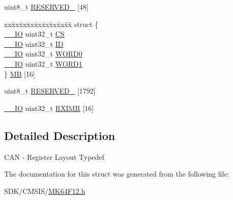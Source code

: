 \begin{DoxyCompactItemize}
\item 
uint8\+\_\+t \mbox{\hyperlink{group___v_r_e_f___peripheral___access___layer_ga3109898e317e51e909c069ce9e83d7be}{R\+E\+S\+E\+R\+V\+E\+D\+\_}} \mbox{[}48\mbox{]}
\item 
\begin{tabbing}
xx\=xx\=xx\=xx\=xx\=xx\=xx\=xx\=xx\=\kill
struct \{\\
\>\mbox{\hyperlink{core__cm4_8h_aec43007d9998a0a0e01faede4133d6be}{\_\_IO}} uint32\_t \mbox{\hyperlink{group___v_r_e_f___peripheral___access___layer_ga5824868cf314b1873a3c1b60bc0a1882}{CS}}\\
\>\mbox{\hyperlink{core__cm4_8h_aec43007d9998a0a0e01faede4133d6be}{\_\_IO}} uint32\_t \mbox{\hyperlink{group___v_r_e_f___peripheral___access___layer_ga88105bb6b46e81bf45146d2a365bc255}{ID}}\\
\>\mbox{\hyperlink{core__cm4_8h_aec43007d9998a0a0e01faede4133d6be}{\_\_IO}} uint32\_t \mbox{\hyperlink{group___v_r_e_f___peripheral___access___layer_ga821a0a45a9a29769080940eebb8550d9}{WORD0}}\\
\>\mbox{\hyperlink{core__cm4_8h_aec43007d9998a0a0e01faede4133d6be}{\_\_IO}} uint32\_t \mbox{\hyperlink{group___v_r_e_f___peripheral___access___layer_ga9092b2359729c2cbd906dfff0471d867}{WORD1}}\\
\} \mbox{\hyperlink{group___v_r_e_f___peripheral___access___layer_gaf9e0c314b6fd1e78c8d6708776c8a9f8}{MB}} \mbox{[}16\mbox{]}\\

\end{tabbing}\item 
uint8\+\_\+t \mbox{\hyperlink{group___v_r_e_f___peripheral___access___layer_ga9e4f40ea0c686c93942d705bcbbdcc98}{R\+E\+S\+E\+R\+V\+E\+D\+\_}} \mbox{[}1792\mbox{]}
\item 
\mbox{\hyperlink{core__cm4_8h_aec43007d9998a0a0e01faede4133d6be}{\+\_\+\+\_\+\+IO}} uint32\+\_\+t \mbox{\hyperlink{group___v_r_e_f___peripheral___access___layer_ga22ac97ce9a5bdf88fe8244dda097722b}{R\+X\+I\+MR}} \mbox{[}16\mbox{]}
\end{DoxyCompactItemize}


\subsection{Detailed Description}
C\+AN -\/ Register Layout Typedef 

The documentation for this struct was generated from the following file\+:\begin{DoxyCompactItemize}
\item 
S\+D\+K/\+C\+M\+S\+I\+S/\mbox{\hyperlink{_m_k64_f12_8h}{M\+K64\+F12.\+h}}\end{DoxyCompactItemize}
